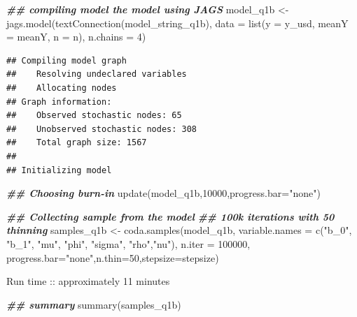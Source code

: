 \documentclass[
]{article}
\newenvironment{Shaded}{\begin{snugshade}}{\end{snugshade}}
\newcommand{\AttributeTok}[1]{\textcolor[rgb]{0.77,0.63,0.00}{#1}}
\newcommand{\DecValTok}[1]{\textcolor[rgb]{0.00,0.00,0.81}{#1}}
\newcommand{\DocumentationTok}[1]{\textcolor[rgb]{0.56,0.35,0.01}{\textbf{\textit{#1}}}}
\newcommand{\FunctionTok}[1]{\textcolor[rgb]{0.00,0.00,0.00}{#1}}
\newcommand{\NormalTok}[1]{#1}
\newcommand{\OtherTok}[1]{\textcolor[rgb]{0.56,0.35,0.01}{#1}}
\newcommand{\StringTok}[1]{\textcolor[rgb]{0.31,0.60,0.02}{#1}}
\begin{document}
\begin{Shaded}
\begin{Highlighting}[]
\DocumentationTok{\#\# compiling model the model using JAGS}
\NormalTok{model\_q1b }\OtherTok{\textless{}{-}} \FunctionTok{jags.model}\NormalTok{(}\FunctionTok{textConnection}\NormalTok{(model\_string\_q1b), }
                      \AttributeTok{data =} \FunctionTok{list}\NormalTok{(}\AttributeTok{y =}\NormalTok{ y\_usd, }\AttributeTok{meanY =}\NormalTok{ meanY,  }\AttributeTok{n =}\NormalTok{ n), }\AttributeTok{n.chains =} \DecValTok{4}\NormalTok{)}
\end{Highlighting}
\end{Shaded}

\begin{verbatim}
## Compiling model graph
##    Resolving undeclared variables
##    Allocating nodes
## Graph information:
##    Observed stochastic nodes: 65
##    Unobserved stochastic nodes: 308
##    Total graph size: 1567
## 
## Initializing model
\end{verbatim}

\begin{Shaded}
\begin{Highlighting}[]
\DocumentationTok{\#\# Choosing burn{-}in }
\FunctionTok{update}\NormalTok{(model\_q1b,}\DecValTok{10000}\NormalTok{,}\AttributeTok{progress.bar=}\StringTok{"none"}\NormalTok{)}


\DocumentationTok{\#\# Collecting sample from the model}
\DocumentationTok{\#\# 100k iterations with 50 thinning }
\NormalTok{samples\_q1b }\OtherTok{\textless{}{-}} \FunctionTok{coda.samples}\NormalTok{(model\_q1b, }\AttributeTok{variable.names =} \FunctionTok{c}\NormalTok{(}\StringTok{"b\_0"}\NormalTok{, }\StringTok{"b\_1"}\NormalTok{, }\StringTok{"mu"}\NormalTok{, }\StringTok{"phi"}\NormalTok{, }\StringTok{"sigma"}\NormalTok{, }\StringTok{"rho"}\NormalTok{,}\StringTok{"nu"}\NormalTok{), }\AttributeTok{n.iter =} \DecValTok{100000}\NormalTok{, }\AttributeTok{progress.bar=}\StringTok{"none"}\NormalTok{,}\AttributeTok{n.thin=}\DecValTok{50}\NormalTok{,}\AttributeTok{stepsize=}\NormalTok{stepsize)}
\end{Highlighting}
\end{Shaded}

Run time :: approximately 11 minutes

\begin{Shaded}
\begin{Highlighting}[]
\DocumentationTok{\#\# summary}
\FunctionTok{summary}\NormalTok{(samples\_q1b)}
\end{Highlighting}
\end{Shaded}
\end{document}
